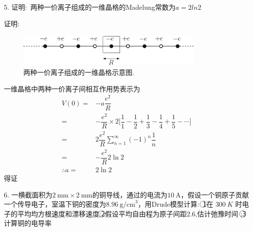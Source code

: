 5. 证明:~两种一价离子组成的一维晶格的\textrm{Madelung}常数为$a=2ln2$

证明:~
\begin{figure}[h!]
\centering
\vspace*{-0.05in}
\includegraphics[height=0.65in,width=3.65in,viewport=0 0 963 162,clip]{Figures/Madelung_constant.png}
\caption{\small 两种一价离子组成的一维晶格示意图.}%
\label{Fig:Madelung_constant}
\end{figure}
一维晶格中两种一价离子间相互作用势表示为
\begin{displaymath}
	\begin{aligned}
		V(0)=&-a\dfrac{e^2}{R}\\
		=&-\dfrac{e^2}R\times2\bigg[\dfrac11-\dfrac12+\dfrac13-\dfrac14+\dfrac15-\cdots\bigg]\\
		=&2\dfrac{e^2}R\sum_{n=1}^{\infty}(-1)^n\dfrac1n\\
		=&-\dfrac{e^2}R2\ln2\\
		\therefore a=&2\ln2
	\end{aligned}
\end{displaymath}
得证

6. 一横截面积为$2~\mathrm{mm}\times2~\mathrm{mm}$的铜导线，通过的电流为$10~\mathrm{A}$，假设一个铜原子贡献一个传导电子，室温下铜的密度为$8.96~\mathrm{g/cm}^3$，用Drude模型计算:~\textcircled{1}在 $300~K$ 时电子的平均均方根速度和漂移速度;\textcircled{2}假设平均自由程为原子间距2.6,估计弛豫时间 ;\textcircled{3}计算铜的电导率


